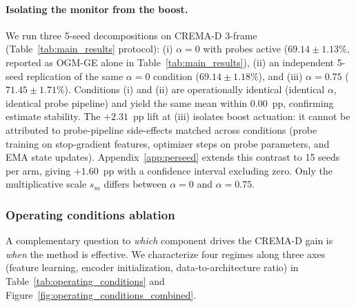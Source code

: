 \documentclass{article}
\begin{document}
\paragraph{Isolating the monitor from the boost.} We run three 5-seed decompositions on CREMA-D 3-frame (Table~\ref{tab:main_results} protocol): (i) $\alpha{=}0$ with probes active ($69.14 \pm 1.13\%$, reported as OGM-GE alone in Table~\ref{tab:main_results}), (ii) an independent 5-seed replication of the same $\alpha{=}0$ condition ($69.14 \pm 1.18\%$), and (iii) $\alpha{=}0.75$ ($71.45 \pm 1.71\%$). Conditions (i) and (ii) are operationally identical (identical $\alpha$, identical probe pipeline) and yield the same mean within $0.00$~pp, confirming estimate stability. The $+2.31$~pp lift at (iii) isolates boost actuation: it cannot be attributed to probe-pipeline side-effects matched across conditions (probe training on stop-gradient features, optimizer steps on probe parameters, and EMA state updates). Appendix~\ref{app:perseed} extends this contrast to 15 seeds per arm, giving $+1.60$~pp with a confidence interval excluding zero. Only the multiplicative scale $s_m$ differs between $\alpha{=}0$ and $\alpha{=}0.75$.
\vspace{-1em}


\subsubsection{Operating conditions ablation}
\label{sec:operating_conditions}
\vspace{-1em}

A complementary question to \emph{which} component drives the CREMA-D gain is \emph{when} the method is effective. We characterize four regimes along three axes (feature learning, encoder initialization, data-to-architecture ratio) in Table~\ref{tab:operating_conditions} and Figure~\ref{fig:operating_conditions_combined}.
\vspace{-1.2em}
\end{document}
